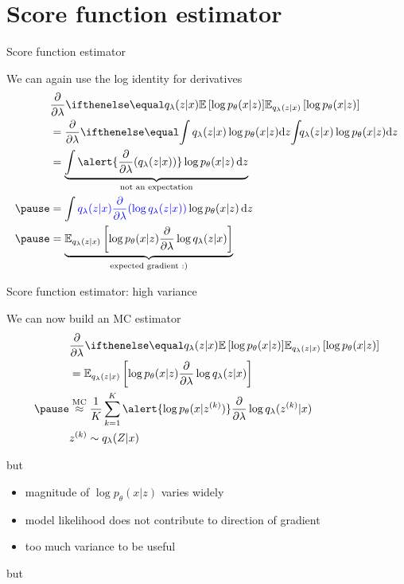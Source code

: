 \section{Score function estimator}

\begin{frame}{Score function estimator}

We can again use the log identity for derivatives
\begin{equation*}
\begin{aligned}
&\pdv{\lambda}\E[q_\lambda(z|x)]{\log p_\theta(x|z)} \\ 
&= \pdv{\lambda} \intl{q_\lambda(z|x)\log p_\theta(x|z)}{z} \\ 
&=  \underbrace{\int \alert{\pdv{\lambda}(q_\lambda(z|x))}\log p_\theta(x|z) \dd{z}}_{\text{not an expectation}} \\ \pause
&= \int \textcolor{blue}{q_\lambda(z|x) \pdv{\lambda}(\log q_\lambda(z|x))} \log p_\theta(x|z) \dd{z} \\ \pause
&= \underbrace{\mathbb E_{q_\lambda(z|x)} \left[  \log p_\theta(x|z)  \pdv{\lambda}\log q_\lambda(z|x)\right]}_{\text{expected gradient :)}}
\end{aligned}
\end{equation*}

\end{frame}

\begin{frame}[plain]{Score function estimator: high variance}


We can now build an MC estimator
\begin{equation*}
\begin{aligned}
&\pdv{\lambda}\E[q_\lambda(z|x)]{\log p_\theta(x|z)} \\ 
&= \mathbb E_{q_\lambda(z|x)} \left[  \log p_\theta(x|z)  \pdv{\lambda}\log q_\lambda(z|x)\right] \\ \pause 
&\overset{\text{MC}}{\approx} \frac{1}{K} \sum_{k=1}^K \alert{\log p_\theta(x|z^{(k)})} \pdv{\lambda}\log q_\lambda(z^{(k)}|x) \\
&z^{(k)} \sim q_\lambda(Z|x)
\end{aligned}
\end{equation*}

\pause
but
\begin{itemize}
	\item magnitude of $\log p_\theta(x|z)$ varies widely \pause 
	\item model likelihood does not contribute to direction of gradient \pause
	\item too much variance to be useful \pause
\end{itemize}
but ~ 
\end{frame}

